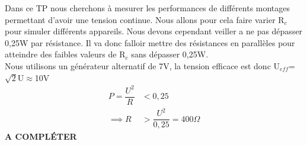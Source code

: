 \documentclass[12pt,a4paper]{article}
\begin{document}
Dans ce TP nous cherchons à mesurer les performances de différents montages permettant d'avoir une tension continue. Nous allons pour cela faire varier R$_{c}$ pour simuler différents appareils. Nous devons cependant veiller a ne pas dépasser 0,25W par résistance. Il va donc falloir mettre des résistances en parallèles pour atteindre des faibles valeurs de R$_{c}$ sans dépasser 0,25W.
\\Nous utilisons un générateur alternatif de 7V, la tension efficace est donc U$_{eff}$=$\sqrt{2}$U$\approx$10V\\
\begin{align*}
P=\dfrac{U^{2}}{R}&<0,25\\
\implies R&>\dfrac{U^{2}}{0,25}=400\Omega
\end{align*}
\textbf{A COMPLÉTER}
\end{document}
